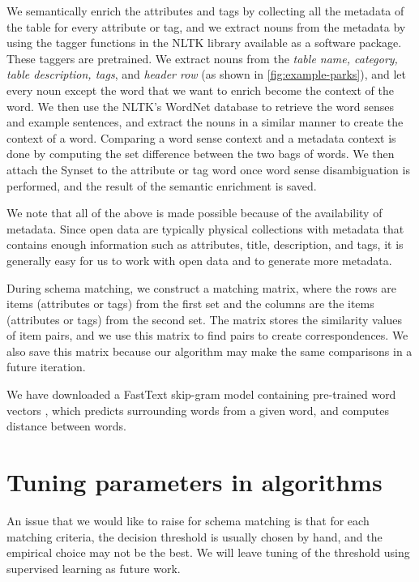 We semantically enrich the attributes and tags by collecting all the metadata of the table for every attribute or tag, and we extract nouns from the metadata by using the tagger functions in the NLTK library \cite{loper-bird-2002-nltk} available as a software package. These taggers are pretrained. We extract nouns from the \textit{table name, category, table description, tags}, and \textit{header row} (as shown in \autoref{fig:example-parks}), and let every noun except the word that we want to enrich become the context of the word. We then use the NLTK's WordNet database to retrieve the word senses and example sentences, and extract the nouns in a similar manner to create the context of a word. Comparing a word sense context and a metadata context is done by computing the set difference between the two bags of words. We then attach the Synset to the attribute or tag word once word sense disambiguation is performed, and the result of the semantic enrichment is saved.

We note that all of the above is made possible because of the availability of metadata. Since open data are typically physical collections with metadata that contains enough information \cite{Rahm2016Case} such as attributes, title, description, and tags, it is generally easy for us to work with open data and to generate more metadata.

During schema matching, we construct a matching matrix, where the rows are items (attributes or tags) from the first set and the columns are the items (attributes or tags) from the second set. The matrix stores the similarity values of item pairs, and we use this matrix to find pairs to create correspondences. We also save this matrix because our algorithm may make the same comparisons in a future iteration.

We have downloaded a FastText skip-gram model containing pre-trained word vectors \cite{mikolov-etal-2018-advances}, which predicts surrounding words from a given word, and computes distance between words.

\section{Tuning parameters in algorithms}
\label{sec:TuningParametersInAlgorithms}

An issue that we would like to raise for schema matching is that for each matching criteria, the decision threshold is usually chosen by hand, and the empirical choice may not be the best. We will leave tuning of the threshold using supervised learning as future work.

